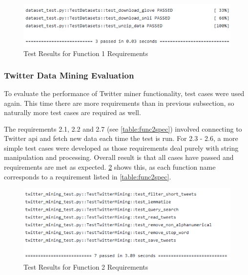             \begin{figure}[!htbp]
                \centering
                \includegraphics[scale=0.9]{img/dataset_test.png}
                \caption{Test Results for Function 1 Requirements}
                \label{fig:testres1}
            \end{figure}
        
        \subsubsection{Twitter Data Mining Evaluation} \label{twittereval}
            To evaluate the performance of Twitter miner functionality, test cases were used again. This time there are more requirements than in previous subsection, so naturally more test cases are required as well.
            
            The requirements 2.1, 2.2 and 2.7 (see \cref{table:func2spec}) involved connecting to Twitter \gls{api} and fetch new data each time the test is run. For 2.3 - 2.6, a more simple test cases were developed as those requirements deal purely with string manipulation and processing. Overall result is that all cases have passed and requirements are met as expected. \cref{fig:testres2} shows this, as each function name corresponds to a requirement listed in \cref{table:func2spec}.
            
            \begin{figure}[!htbp]
                \centering
                \includegraphics[]{img/twitter_mining_test.png}
                \caption{Test Results for Function 2 Requirements}
                \label{fig:testres2}
            \end{figure}
            

